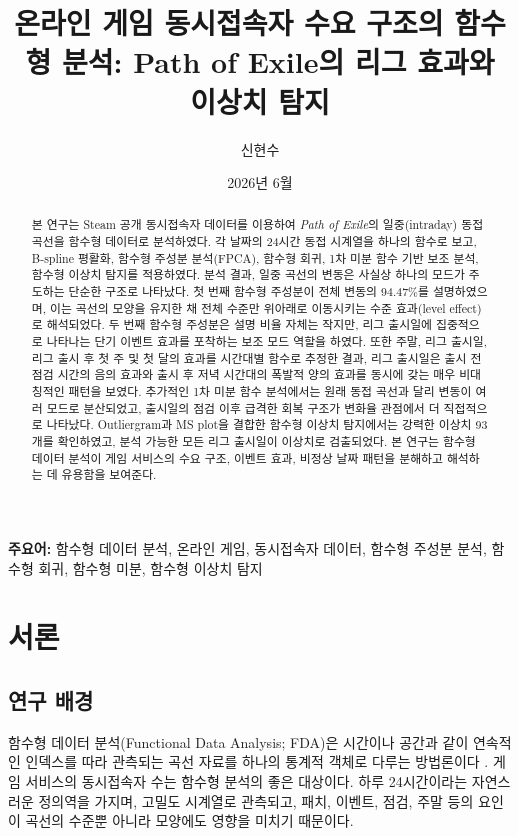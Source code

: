 \documentclass[11pt,a4paper]{article}
\title{온라인 게임 동시접속자 수요 구조의 함수형 분석: Path of Exile의 리그 효과와 이상치 탐지}
\author{신현수}
\date{2026년 6월}
\begin{document}
\maketitle

\begin{abstract}
본 연구는 Steam 공개 동시접속자 데이터를 이용하여 \textit{Path of Exile}의 일중(intraday) 동접 곡선을 함수형 데이터로 분석하였다. 각 날짜의 24시간 동접 시계열을 하나의 함수로 보고, B-spline 평활화, 함수형 주성분 분석(FPCA), 함수형 회귀, 1차 미분 함수 기반 보조 분석, 함수형 이상치 탐지를 적용하였다. 분석 결과, 일중 곡선의 변동은 사실상 하나의 모드가 주도하는 단순한 구조로 나타났다. 첫 번째 함수형 주성분이 전체 변동의 94.47\%를 설명하였으며, 이는 곡선의 모양을 유지한 채 전체 수준만 위아래로 이동시키는 수준 효과(level effect)로 해석되었다. 두 번째 함수형 주성분은 설명 비율 자체는 작지만, 리그 출시일에 집중적으로 나타나는 단기 이벤트 효과를 포착하는 보조 모드 역할을 하였다. 또한 주말, 리그 출시일, 리그 출시 후 첫 주 및 첫 달의 효과를 시간대별 함수로 추정한 결과, 리그 출시일은 출시 전 점검 시간의 음의 효과와 출시 후 저녁 시간대의 폭발적 양의 효과를 동시에 갖는 매우 비대칭적인 패턴을 보였다. 추가적인 1차 미분 함수 분석에서는 원래 동접 곡선과 달리 변동이 여러 모드로 분산되었고, 출시일의 점검 이후 급격한 회복 구조가 변화율 관점에서 더 직접적으로 나타났다. Outliergram과 MS plot을 결합한 함수형 이상치 탐지에서는 강력한 이상치 93개를 확인하였고, 분석 가능한 모든 리그 출시일이 이상치로 검출되었다. 본 연구는 함수형 데이터 분석이 게임 서비스의 수요 구조, 이벤트 효과, 비정상 날짜 패턴을 분해하고 해석하는 데 유용함을 보여준다.
\end{abstract}

\noindent\textbf{주요어:} 함수형 데이터 분석, 온라인 게임, 동시접속자 데이터, 함수형 주성분 분석, 함수형 회귀, 함수형 미분, 함수형 이상치 탐지

\newpage
\tableofcontents
\newpage

\section{서론}

\subsection{연구 배경}
함수형 데이터 분석(Functional Data Analysis; FDA)은 시간이나 공간과 같이 연속적인 인덱스를 따라 관측되는 곡선 자료를 하나의 통계적 객체로 다루는 방법론이다 \citep{ramsay2005functional}. 게임 서비스의 동시접속자 수는 함수형 분석의 좋은 대상이다. 하루 24시간이라는 자연스러운 정의역을 가지며, 고밀도 시계열로 관측되고, 패치, 이벤트, 점검, 주말 등의 요인이 곡선의 수준뿐 아니라 모양에도 영향을 미치기 때문이다.
\end{document}
